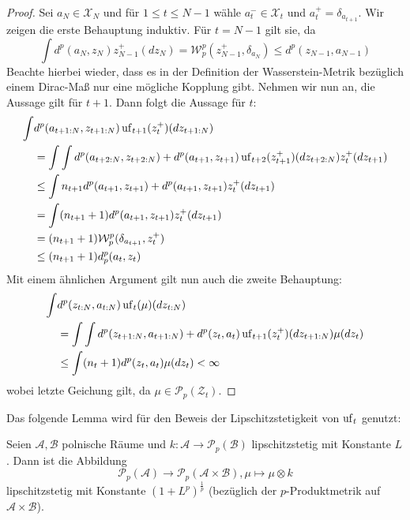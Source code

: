 \begin{proof}
Sei $a_N \in \mathcal{X}_N$ und für $1\leq t \leq N-1$ wähle $a_t^-\in\mathcal{X}_t$ und $a_t^+ = \delta_{a_{t+1}}$. 
Wir zeigen die erste Behauptung induktiv. Für $t=N-1$ gilt sie, da
$$\int d^p(a_N, z_N)z_{N-1}^+(dz_N)=\mathcal{W}_p^p(z_{N-1}^+, \delta_{a_N}) \leq d^p(z_{N-1}, a_{N-1})$$
Beachte hierbei wieder, dass es in der Definition der Wasserstein-Metrik bezüglich einem Dirac-Maß nur eine mögliche Kopplung gibt. Nehmen wir nun an, die Aussage gilt für $t+1$. Dann folgt die Aussage für $t$:
\begin{align*}
\int &d^p(a_{t+1:N}, z_{t+1:N}) \operatorname{uf}_{t+1}(z_t^+)(dz_{t+1:N}) \\
&= \int\int d^p(a_{t+2:N}, z_{t+2:N}) + d^p(a_{t+1}, z_{t+1}) \operatorname{uf}_{t+2}(z_{t+1}^+)(dz_{t+2:N})z_t^+(dz_{t+1}) \\
&\leq \int n_{t+1}d^p(a_{t+1}, z_{t+1}) + d^p(a_{t+1}, z_{t+1}) z_t^+(dz_{t+1}) \\
&= \int (n_{t+1}+1)d^p(a_{t+1}, z_{t+1}) z_t^+(dz_{t+1}) \\
&= (n_{t+1}+1)\mathcal{W}_p^p(\delta_{a_{t+1}}, z_t^+) \\
&\leq (n_{t+1}+1)d_p^p(a_t, z_t)
\end{align*}
Mit einem ähnlichen Argument gilt nun auch die zweite Behauptung:
\begin{align*}
\int &d^p(z_{t:N}, a_{t:N})\operatorname{uf}_{t}(\mu)(dz_{t:N}) \\
&= \int\int d^p(z_{t+1:N}, a_{t+1:N})+d^p(z_t, a_t)\operatorname{uf}_{t+1}(z_t^+)(dz_{t+1:N})\mu(dz_t) \\
&\leq \int (n_{t}+1)d^p(z_t, a_t)\mu(dz_t) < \infty
\end{align*}
wobei letzte Geichung gilt, da $\mu \in\mathcal{P}_p(\mathcal{Z}_t)$.
\end{proof}
Das folgende Lemma wird für den Beweis der Lipschitzstetigkeit von $\operatorname{uf}_t$ genutzt:
\begin{lemma}\label{thm:lipschitz_continuous_kernel}
    Seien $\mathcal{A,B}$ polnische Räume und $k: \mathcal{A} \rightarrow \mathcal{P}_p(\mathcal{B})$ lipschitzstetig mit Konstante $L$. Dann ist die Abbildung 
    $$\mathcal{P}_p(\mathcal{A}) \rightarrow \mathcal{P}_p(\mathcal{A} \times \mathcal{B}), \mu \mapsto \mu \otimes k$$
    lipschitzstetig mit Konstante $(1+L^p)^\frac{1}{p}$ (bezüglich der $p$-Produktmetrik auf $\mathcal{A}\times \mathcal{B}$).
\end{lemma}
